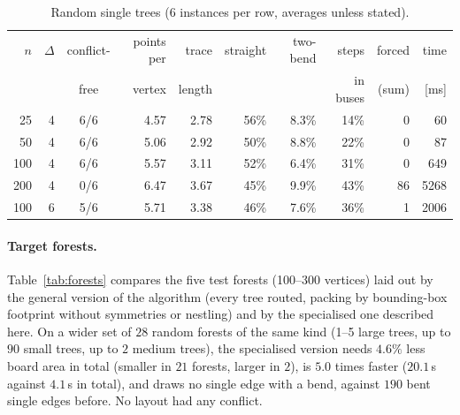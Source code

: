 \documentclass[11pt,a4paper]{article}
\theoremstyle{remark}
\begin{document}
\begin{table}[t]
\centering
\caption{Random single trees (6 instances per row, averages unless stated).}
\label{tab:results}
\small\setlength{\tabcolsep}{4.2pt}
\begin{tabular}{rrcrrrrrrr}
\toprule
$n$ & $\Delta$ & conflict- & points per & trace & straight & two-bend & steps & forced & time\\
 & & free & vertex & length & & & in buses & (sum) & [ms]\\
\midrule
25 & 4 & 6/6 & 4.57 & 2.78 & 56\% & 8.3\% & 14\% & 0 & 60\\
50 & 4 & 6/6 & 5.06 & 2.92 & 50\% & 8.8\% & 22\% & 0 & 87\\
100 & 4 & 6/6 & 5.57 & 3.11 & 52\% & 6.4\% & 31\% & 0 & 649\\
200 & 4 & 0/6 & 6.47 & 3.67 & 45\% & 9.9\% & 43\% & 86 & 5268\\
100 & 6 & 5/6 & 5.71 & 3.38 & 46\% & 7.6\% & 36\% & 1 & 2006\\
\bottomrule
\end{tabular}
\end{table}

\paragraph{Target forests.} Table~\ref{tab:forests} compares the five test forests (100--300 vertices) laid out by
the general version of the algorithm (every tree routed, packing by bounding-box footprint without symmetries or
nestling) and by the specialised one described here. On a wider set of $28$ random forests of the same kind (1--5
large trees, up to $90$ small trees, up to $2$ medium trees), the specialised version needs $4.6\%$ less board area
in total (smaller in $21$ forests, larger in $2$), is $5.0$ times faster ($20.1$\,s against $4.1$\,s in total), and
draws no single edge with a bend, against $190$ bent single edges before. No layout had any conflict.
\end{document}

